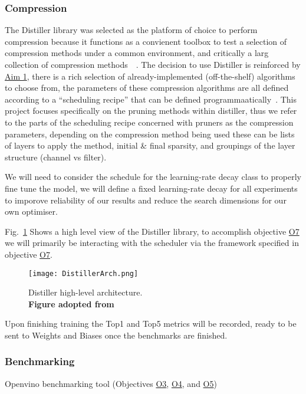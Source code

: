 \documentclass[../D1.tex]{subfiles}
\begin{document}
\subsubsection{Compression}
The Distiller library was selected as the platform of choice to perform compression because it functions as a convienent toolbox to test a selection of compression methods under a common environment, and critically a larg collection of compression methods~~\autocite{zmoraNeuralNetworkDistiller2019}.
The decision to use Distiller is reinforced by \hyperref[Aim1]{Aim 1}, there is a rich selection of already-implemented (off-the-shelf) algorithms to choose from, the parameters of these compression algorithms are all defined according to a ``scheduling recipe'' that can be defined programmaatically~\autocite{zmoraNeuralNetworkDistiller2019}.
This project focuses specifically on the pruning methods within distiller, thus we refer to the parts of the scheduling recipe concerned with pruners as the compression parameters, depending on the compression method being used these can be lists of layers to apply the method, initial \& final sparsity, and groupings of the layer structure (channel vs filter).


We will need to consider the schedule for the learning-rate decay class to properly fine tune the model, we will define a fixed learning-rate decay for all experiments to imporove reliability of our results and reduce the search dimensions for our own optimiser.

Fig.~\ref{fig:DistillerArch} Shows a high level view of the Distiller library, to accomplish objective \hyperref[obj:CompPara]{O7} we will primarily be interacting with the scheduler via the framework specified in objective \hyperref[obj:CompPara]{O7}.

\begin{figure}[h]
    \texttt{[image: DistillerArch.png]}
    \caption{Distiller high-level architecture.\\ \textbf{Figure adopted from~\autocite{zmoraNeuralNetworkDistiller2019}}}
    \label{fig:DistillerArch}
\end{figure}

Upon finishing training the Top1 and Top5 metrics will be recorded, ready to be sent to Weights and Biases once the benchmarks are finished. 

\subsubsection{Benchmarking}
Openvino benchmarking tool (Objectives \hyperref[obj:EvalE2E]{O3}, \hyperref[obj:EvalLayer]{O4}, and \hyperref[obj:EvalComp]{O5})
\end{document}
